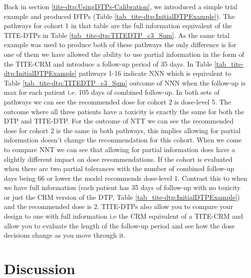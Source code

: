 Back in section \ref{tite-dtp:UsingDTPs-Calibration}, we introduced a simple trial example and produced DTPs (Table \ref{tab_tite-dtp:InitialDTPExample}). The pathways for cohort 1 in that table are the full information equivalent of the TITE-DTPs in Table \ref{tab_tite-dtp:TITEDTP_c3_Sum}. As the same trial example was used to produce both of these pathways the only difference is for one of them we have allowed the ability to use partial information in the form of the TITE-CRM and introduce a follow-up period of 35 days. In Table \ref{tab_tite-dtp:InitialDTPExample} pathways 1-16 indicate NNN which is equivalent to Table \ref{tab_tite-dtp:TITEDTP_c3_Sum} outcome of NNN when the follow-up is max for each patient i.e. 105 days of combined follow-up. In both sets of pathways we can see the recommended dose for cohort 2 is dose-level 5. The outcome where all three patients have a toxicity is exactly the same for both the DTP and TITE-DTP. For the outcome of NTT we can see the recommended dose for cohort 2 is the same in both pathways, this implies allowing for partial information doesn't change the recommendation for this cohort. When we come to compare NNT we can see that allowing for partial information does have a slightly different impact on dose recommendations. If the cohort is evaluated when there are two partial tolerances with the number of combined follow-up days being 66 or lower the model recommends dose-level 1. Contrast this to when we have full information (each patient has 35 days of follow-up with no toxicity or just the CRM version of the DTP, Table \ref{tab_tite-dtp:InitialDTPExample}) and the recommended dose is 2. TITE-DTPs also allow you to compare your design to one with full information i.e the CRM equivalent of a TITE-CRM and allow you to evaluate the length of the follow-up period and see how the dose decisions change as you move through it. 


\section{Discussion}
\label{tite-dtp:Discussion}

